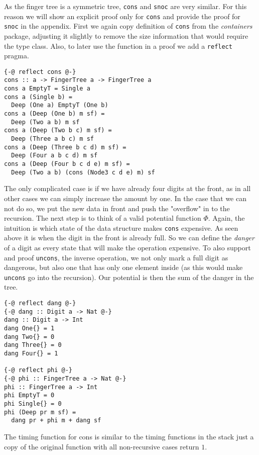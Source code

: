 \documentclass[sigplan,screen]{acmart}
\begin{document}
As the finger tree is a symmetric tree, \texttt{cons} and \texttt{snoc} are very similar. For this reason we will show an explicit proof only for \texttt{cons} and provide the proof for \texttt{snoc} in the appendix. First we again copy definition of \texttt{cons} from the \textit{containers} package, adjusting it slightly to remove the size information that would require the type class. Also, to later use the function in a proof we add a \texttt{reflect} pragma.

\begin{lstlisting}
{-@ reflect cons @-}
cons :: a -> FingerTree a -> FingerTree a
cons a EmptyT = Single a
cons a (Single b) =
  Deep (One a) EmptyT (One b)
cons a (Deep (One b) m sf) =
  Deep (Two a b) m sf
cons a (Deep (Two b c) m sf) =
  Deep (Three a b c) m sf
cons a (Deep (Three b c d) m sf) =
  Deep (Four a b c d) m sf
cons a (Deep (Four b c d e) m sf) =
  Deep (Two a b) (cons (Node3 c d e) m) sf
\end{lstlisting}

The only complicated case is if we have already four digits at the front, as in all other cases we can simply increase the amount by one. In the case that we can not do so, we put the new data in front and push the "overflow" in to the recursion. The next step is to think of a valid potential function $\Phi$. Again, the intuition is which state of the data structure makes \texttt{cons} expensive. As seen above it is when the digit in the front is already full. So we can define the \textit{danger} of a digit as every state that will make the operation expensive. To also support and proof \texttt{uncons}, the inverse operation, we not only mark a full digit as dangerous, but also one that has only one element inside (as this would make \texttt{uncons} go into the recursion). Our potential is then the sum of the danger in the tree.

\begin{lstlisting}
{-@ reflect dang @-}
{-@ dang :: Digit a -> Nat @-}
dang :: Digit a -> Int
dang One{} = 1
dang Two{} = 0
dang Three{} = 0
dang Four{} = 1

{-@ reflect phi @-}
{-@ phi :: FingerTree a -> Nat @-}
phi :: FingerTree a -> Int
phi EmptyT = 0
phi Single{} = 0
phi (Deep pr m sf) =
  dang pr + phi m + dang sf
\end{lstlisting}

The timing function for cons is similar to the timing functions in the stack just a copy of the original function with all non-recursive cases return $1$.
\end{document}
